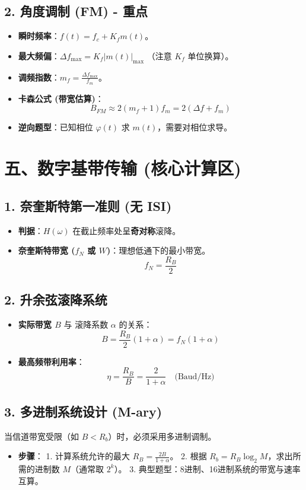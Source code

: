 \documentclass[12pt, a4paper]{article}
\begin{document}
	\subsection{2. 角度调制 (FM) - 重点}
	\begin{itemize}
		\item \textbf{瞬时频率}：$f(t) = f_c + K_f m(t)$。
		\item \textbf{最大频偏}：$\Delta f_{\max} = K_f |m(t)|_{\max}$ （注意 $K_f$ 单位换算）。
		\item \textbf{调频指数}：$m_f = \frac{\Delta f_{\max}}{f_m}$。
		\item \textbf{卡森公式 (带宽估算)}：
		\[
		B_{FM} \approx 2(m_f + 1)f_m = 2(\Delta f + f_m)
		\]
		\item \textbf{逆向题型}：已知相位 $\varphi(t)$ 求 $m(t)$，需要对相位求导。
	\end{itemize}
	
	\section{五、数字基带传输 (核心计算区)}
	\subsection{1. 奈奎斯特第一准则 (无 ISI)}
	\begin{itemize}
		\item \textbf{判据}：$H(\omega)$ 在截止频率处呈\textbf{奇对称}滚降。
		\item \textbf{奈奎斯特带宽 ($f_N$ 或 $W$)}：理想低通下的最小带宽。
		\[
		f_N = \frac{R_B}{2}
		\]
	\end{itemize}
	
	\subsection{2. 升余弦滚降系统}
	\begin{itemize}
		\item \textbf{实际带宽 $B$} 与 滚降系数 $\alpha$ 的关系：
		\[
		B = \frac{R_B}{2}(1+\alpha) = f_N(1+\alpha)
		\]
		\item \textbf{最高频带利用率}：
		\[
		\eta = \frac{R_B}{B} = \frac{2}{1+\alpha} \quad \text{(Baud/Hz)}
		\]
	\end{itemize}
	
	\subsection{3. 多进制系统设计 (M-ary)}
	当信道带宽受限（如 $B < R_b$）时，必须采用多进制调制。
	\begin{itemize}
		\item \textbf{步骤}：
		1. 计算系统允许的最大 $R_B = \frac{2B}{1+\alpha}$。
		2. 根据 $R_b = R_B \log_2 M$，求出所需的进制数 $M$（通常取 $2^k$）。
		3. 典型题型：8进制、16进制系统的带宽与速率互算。
	\end{itemize}
	
\end{document}

